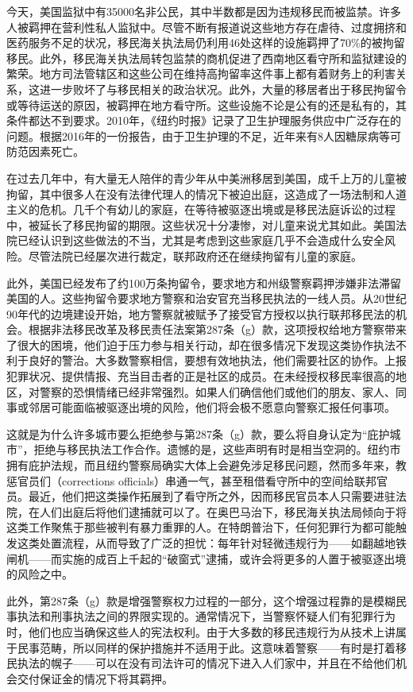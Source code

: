 \documentclass[fontset=fandol, a4paper, 12pt, openright]{ctexbook}
\begin{document}
今天，美国监狱中有35000名非公民，其中半数都是因为违规移民而被监禁。许多人被羁押在营利性私人监狱中。尽管不断有报道说这些地方存在虐待、过度拥挤和医药服务不足的状况，移民海关执法局仍利用46处这样的设施羁押了70\%的被拘留移民。此外，移民海关执法局转包监禁的商机促进了西南地区看守所和监狱建设的繁荣。地方司法管辖区和这些公司在维持高拘留率这件事上都有着财务上的利害关系，这进一步败坏了与移民相关的政治状况。此外，大量的移居者出于移民拘留令或等待运送的原因，被羁押在地方看守所。这些设施不论是公有的还是私有的，其条件都达不到要求。2010年，《纽约时报》记录了卫生护理服务供应中广泛存在的问题。根据2016年的一份报告，由于卫生护理的不足，近年来有8人因糖尿病等可防范因素死亡。

在过去几年中，有大量无人陪伴的青少年从中美洲移居到美国，成千上万的儿童被拘留，其中很多人在没有法律代理人的情况下被迫出庭，这造成了一场法制和人道主义的危机。几千个有幼儿的家庭，在等待被驱逐出境或是移民法庭诉讼的过程中，被延长了移民拘留的期限。这些状况十分凄惨，对儿童来说尤其如此。美国法院已经认识到这些做法的不当，尤其是考虑到这些家庭几乎不会造成什么安全风险。尽管法院已经屡次进行裁定，联邦政府还在继续拘留有儿童的家庭。

此外，美国已经发布了约100万条拘留令，要求地方和州级警察羁押涉嫌非法滞留美国的人。这些拘留令要求地方警察和治安官充当移民执法的一线人员。从20世纪90年代的边境建设开始，地方警察就被赋予了接受官方授权以执行联邦移民法的机会。根据非法移民改革及移民责任法案第287条（g）款，这项授权给地方警察带来了很大的困境，他们迫于压力参与相关行动，却在很多情况下发现这类协作执法不利于良好的警治。大多数警察相信，要想有效地执法，他们需要社区的协作。上报犯罪状况、提供情报、充当目击者的正是社区的成员。在未经授权移民率很高的地区，对警察的恐惧情绪已经非常强烈。如果人们确信他们或他们的朋友、家人、同事或邻居可能面临被驱逐出境的风险，他们将会极不愿意向警察汇报任何事项。

这就是为什么许多城市要么拒绝参与第287条（g）款，要么将自身认定为“庇护城市”，拒绝与移民执法工作合作。遗憾的是，这些声明有时是相当空洞的。纽约市拥有庇护法规，而且纽约警察局确实大体上会避免涉足移民问题，然而多年来，教惩官员们（corrections officials）串通一气，甚至租借看守所中的空间给联邦官员。最近，他们把这类操作拓展到了看守所之外，因而移民官员本人只需要进驻法院，在人们出庭后将他们逮捕就可以了。在奥巴马治下，移民海关执法局倾向于将这类工作聚焦于那些被判有暴力重罪的人。在特朗普治下，任何犯罪行为都可能触发这类处置流程，从而导致了广泛的担忧：每年针对轻微违规行为——如翻越地铁闸机——而实施的成百上千起的“破窗式”逮捕，或许会将更多的人置于被驱逐出境的风险之中。

此外，第287条（g）款是增强警察权力过程的一部分，这个增强过程靠的是模糊民事执法和刑事执法之间的界限实现的。通常情况下，当警察怀疑人们有犯罪行为时，他们也应当确保这些人的宪法权利。由于大多数的移民违规行为从技术上讲属于民事范畴，所以同样的保护措施并不适用于此。这意味着警察——有时是打着移民执法的幌子——可以在没有司法许可的情况下进入人们家中，并且在不给他们机会交付保证金的情况下将其羁押。
\end{document}
